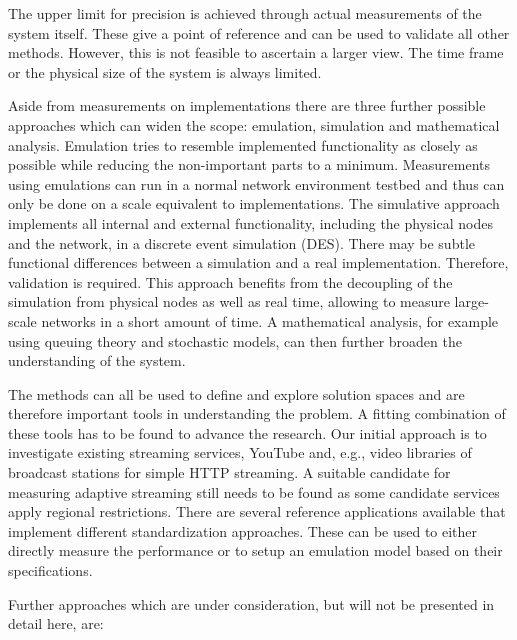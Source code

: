 The upper limit for precision is achieved through actual measurements of the system itself. These give a point of reference and can be used to validate all other methods. However, this is not feasible to ascertain a larger view. The time frame or the physical size of the system is always limited.

Aside from measurements on implementations there are three further possible approaches which can widen the scope: emulation, simulation and mathematical analysis. 
Emulation tries to resemble implemented functionality as closely as possible while reducing the non-important parts to a minimum. Measurements using emulations can run in a normal network environment testbed and thus can only be done on a scale equivalent to implementations. The simulative approach implements all internal and external functionality, including the physical nodes and the network, in a discrete event simulation (DES). There may be subtle functional differences between a simulation and a real implementation. Therefore, validation is required. This approach benefits from the decoupling of the simulation from physical nodes as well as real time, allowing to measure large-scale networks in a short amount of time.
A mathematical analysis, for example using queuing theory and stochastic models, can then further broaden the understanding of the system.


The methods can all be used to define and explore solution spaces and are therefore important tools in understanding the problem. A fitting combination of these tools has to be found to advance the research. Our initial approach is to investigate existing streaming services, YouTube \cite{metzger2011delivery,mok2011measuring} and, e.g., video libraries of broadcast stations for simple HTTP streaming. A suitable candidate for measuring adaptive streaming still needs to be found as some candidate services apply regional restrictions. There are several reference applications available that implement different standardization approaches. These can be used to either directly measure the performance or to setup an emulation model based on their specifications.


Further approaches which are under consideration, but will not be presented in detail here, are:

